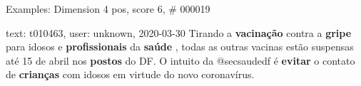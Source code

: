 \begin{frame}{Examples: Dimension 4 pos, score 6, \# 000019}
\footnotesize
\begin{exampleblock}{text: t010463, user: unknown, 2020-03-30}
Tirando a \textbf{vacinação} contra a \textbf{gripe} para idosos e 
\textbf{profissionais} da \textbf{saúde} , todas as outras vacinas estão 
suspensas até 15 de abril nos \textbf{postos} do DF. O intuito da @secsaudedf é 
\textbf{evitar} o contato de \textbf{crianças} com idosos em virtude do novo 
coronavírus. 
\end{exampleblock}
\end{frame}
